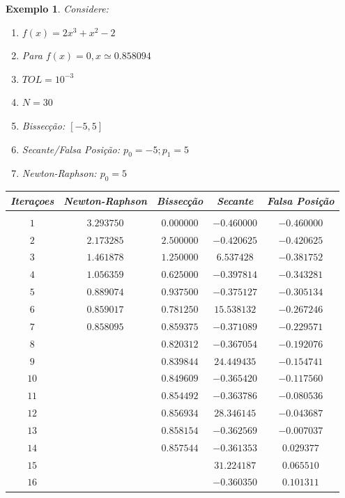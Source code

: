 \documentclass[a4paper, 10pt]{article} %
\newtheorem{exemplo}{Exemplo}[section]
\theoremstyle{definition}
\theoremstyle{definition}
\numberwithin{equation}{section} %
\numberwithin{lstlisting}{section}
\numberwithin{algorithm}{section}
\numberwithin{table}{section}
\begin{document}
\begin{exemplo}
Considere:
\begin{enumerate}
 \item $f(x) = 2x^3 + x^2 - 2$
 \item Para $f(x) = 0, x \simeq 0.858094$
 \item $TOL = 10^{-3}$
 \item $N = 30$
 \item Bissecção: $[-5,5]$
 \item Secante/Falsa Posição: $p_0 = -5; p_1 = 5$
 \item Newton-Raphson: $p_0 = 5$
\end{enumerate}
 \begin{table}[H]\label{ex:convergencia}\centering
   \begin{tabular}{c|cccc}
    Iteraçoes & Newton-Raphson & 	Bissecção & 	Secante & 	Falsa Posição \\
    \hline\\
    $1$ & $3.293750$ & 	$0.000000$ & 	$-0.460000$ & 	$-0.460000$\\
    $2$ & $2.173285$ & 	$2.500000$ & 	$-0.420625$ & 	$-0.420625$\\
    $3$ & $1.461878$ & 	$1.250000$ & 	$6.537428$  & 	$-0.381752$\\
    $4$ & $1.056359$ & 	$0.625000$ & 	$-0.397814$ & 	$-0.343281$\\
    $5$ & $0.889074$ & 	$0.937500$ & 	$-0.375127$ & 	$-0.305134$\\
    $6$ & $0.859017$ & 	$0.781250$ & 	$15.538132$ & 	$-0.267246$\\
    $7$ & $0.858095$ & 	$0.859375$ & 	$-0.371089$ & 	$-0.229571$\\
    $8$ & 		   & 	$0.820312$ & 	$-0.367054$ & 	$-0.192076$\\
    $9$ & 		   & 	$0.839844$ & 	$24.449435$ & 	$-0.154741$\\
    $10$ & 		   & 	$0.849609$ & 	$-0.365420$ & 	$-0.117560$\\
    $11$ & 		   & 	$0.854492$ & 	$-0.363786$ & 	$-0.080536$\\
    $12$ & 		   & 	$0.856934$ & 	$28.346145$ & 	$-0.043687$\\
    $13$ & 		   & 	$0.858154$ & 	$-0.362569$ & 	$-0.007037$\\
    $14$ & 		   & 	$0.857544$ & 	$-0.361353$ & 	$0.029377$\\
    $15$ & 				  & 	   & 	$31.224187$ & 	$0.065510$\\
    $16$ & 				  & 	   & 	$-0.360350$ & 	$0.101311$\\

\end{tabular}
\end{table}
\end{exemplo}
\end{document}

